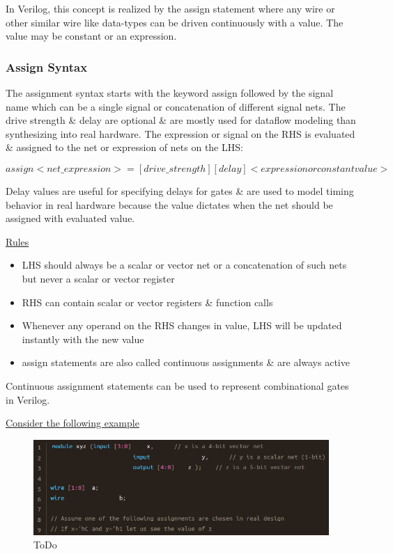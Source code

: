 \documentclass{article}
\begin{document}
	In Verilog, this concept is realized by the assign statement where any wire or other similar wire like data-types can be driven continuously with a value. The value may be constant or an expression.

	\subsubsection{Assign Syntax}

	The assignment syntax starts with the keyword assign followed by the signal name which can be a single signal or concatenation of different signal nets. The drive strength \& delay are optional
	\& are mostly used for dataflow modeling than synthesizing into real hardware. The expression or signal on the RHS is evaluated \& assigned to the net or expression of nets on the LHS:

	\[ assign <net\_expression> = [drive\_strength] [delay] <expression or constant value> \] \newline

	Delay values are useful for specifying delays for gates \& are used to model timing behavior in real hardware because the value dictates when the net should be assigned with evaluated value. \newline \newline

	\underline{Rules} \newline \newline

	\begin{itemize}
		\item LHS should always be a scalar or vector net or a concatenation of such nets but never a scalar or vector register
		\item RHS can contain scalar or vector registers \& function calls
		\item Whenever any operand on the RHS changes in value, LHS will be updated instantly with the new value
		\item assign statements are also called continuous assignments \& are always active
	\end{itemize}

	Continuous assignment statements can be used to represent combinational gates in Verilog. \newline

	\underline{Consider the following example}

	\begin{figure}[H]
		\includegraphics[width=\linewidth]{VerilogPics/figure_33.png}
		\caption{ToDo}
		\label{ToDo}
	\end{figure}
\end{document}
